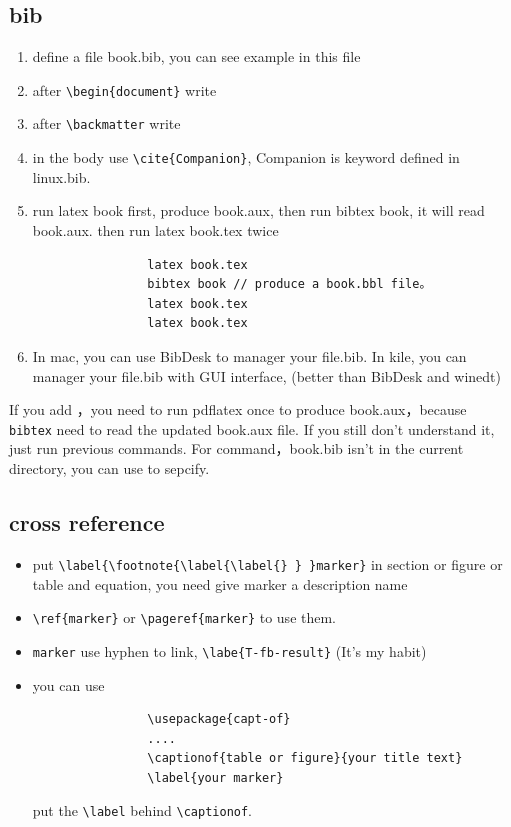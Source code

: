 \documentclass[a4paper,12pt,twoside]{book}
\begin{document}
	\subsection{bib}
		\begin{enumerate}
			\item define a file book.bib, you can see example in this file
			\item after \verb=\begin{document}= write \verb==
			\item after \verb=\backmatter= write \verb==
			\item in the body use \verb=\cite{Companion}=, Companion is keyword defined in linux.bib.
			\item run latex book first, produce book.aux, then run bibtex book, it will read book.aux. then run latex book.tex twice
				\begin{verbatim}
				latex book.tex
				bibtex book // produce a book.bbl file。
				latex book.tex
				latex book.tex
				\end{verbatim}
			\item In mac, you can use BibDesk to manager your file.bib. In kile, you can manager your file.bib with GUI interface, (better than BibDesk and winedt)
			\end{enumerate}
        If you add \verb==，you need to run pdflatex once to produce book.aux，because \verb=bibtex= need to read the updated book.aux file. If you still don't understand it, just run previous commands. For \verb== command，book.bib isn't in the current directory,  you can use \verb==to sepcify.
		\subsection{cross reference}
			\begin{itemize}
				\item put \verb=\label{\footnote{\label{\label{} } }marker}= in section or figure or table and equation, you need give marker a description name
				\item \verb=\ref{marker}= or \verb=\pageref{marker}= to use them.
				\item \verb=marker= use hyphen to link, \verb=\labe{T-fb-result}= (It's my habit)
				\item you can use
				\begin{verbatim}
				\usepackage{capt-of}
				....
				\captionof{table or figure}{your title text}
				\label{your marker}
				\end{verbatim}
				put the \verb=\label= behind \verb=\captionof=.
	
			\end{itemize}
\end{document}
